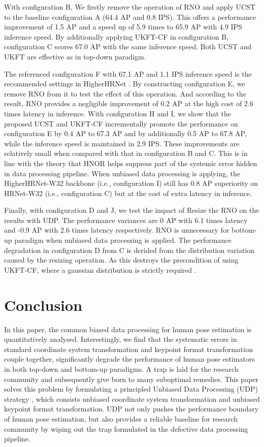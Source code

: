 \documentclass[10pt,journal,compsoc]{IEEEtran}
\begin{document}
With configuration B, We firstly remove the operation of RNO and apply UCST to the baseline configuration A (64.4 AP and 0.8 IPS). This offers a performance improvement of 1.5 AP and a speed up of 5.9 times to 65.9 AP with 4.9 IPS inference speed. By additionally applying UKFT-CF in configuration B, configuration C scores 67.0 AP with the same inference speed. Both UCST and UKFT are effective as in top-down paradigm.

The referenced configuration F with 67.1 AP and 1.1 IPS inference speed is the recommended settings in HigherHRNet \cite{Higher}. By constructing configuration E, we remove RNO from it to test the effect of this operation. And according to the result, RNO provides a negligible improvement of 0.2 AP at the high cost of 2.6 times latency in inference. With configuration H and I, we show that the proposed UCST and UKFT-CF incrementally promote the performance on configuration E by 0.4 AP to 67.3 AP and by additionally 0.5 AP to 67.8 AP, while the inference speed is maintained in 2.9 IPS. These improvements are relatively small when compared with that in configuration B and C. This is in line with the theory that HNOR helps suppress part of the systemic error hidden in data processing pipeline. When unbiased data processing is applying, the HigherHRNet-W32 backbone (i.e., configuration I) still has 0.8 AP superiority on HRNet-W32 (i.e., configuration C) but at the cost of extra  latency in inference.

Finally, with configuration D and J, we test the impact of Resize the RNO on the results with UDP. The performance variances are 0 AP with 6.1 times latency and -0.9 AP with 2.6 times latency respectively. RNO is unnecessary for bottom-up paradigm when unbiased data processing is applied. The performance degradation in configuration D from C is derided from the distribution variation caused by the resizing operation. As this destroys the precondition of using UKFT-CF, where a gaussian distribution is strictly required \cite{DARK}.


\section{Conclusion}
In this paper, the common biased data processing for human pose estimation is quantitatively analysed. Interestingly, we find that the systematic errors in standard coordinate system transformation and keypoint format transformation couple together, significantly degrade the performance of human pose estimators in both top-down and bottom-up paradigms. A trap is laid for the research community and subsequently give born to many suboptimal remedies. This paper solves this problem by formulating a principled Unbiased Data Processing (UDP) strategy , which consists unbiased coordinate system transformation and unbiased keypoint format transformation. UDP not only pushes the performance boundary of human pose estimation, but also provides a reliable baseline for research community by wiping out the trap formulated in the defective data processing pipeline.










\ifCLASSOPTIONcaptionsoff
  \newpage
\fi









\end{document}
